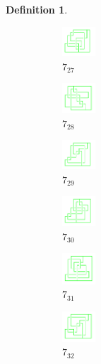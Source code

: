 \documentclass{article}
\theoremstyle{definition}
\newtheorem{defn}[thm]{Definition}
\theoremstyle{theorem}
\theoremstyle{proposition}
\theoremstyle{corollary}
\begin{document}
\begin{defn}
\begin{figure}[H]
    \begin{subfigure}{0.075\textwidth}
    \includegraphics[width=1.25cm]{../Midterm_Poster/grid_diagram/handcuff_7_27.png}
    \caption{$7_{27}$} 
    \end{subfigure}
    \begin{subfigure}{0.075\textwidth}
    \includegraphics[width=1.25cm]{../Midterm_Poster/grid_diagram/handcuff_7_28.png}
    \caption{$7_{28}$} 
    \end{subfigure}
    \begin{subfigure}{0.075\textwidth}
    \includegraphics[width=1.25cm]{../Midterm_Poster/grid_diagram/handcuff_7_29.png}
    \caption{$7_{29}$} 
    \end{subfigure}
    \begin{subfigure}{0.075\textwidth}
    \includegraphics[width=1.25cm]{../Midterm_Poster/grid_diagram/handcuff_7_30.png}
    \caption{$7_{30}$} 
    \end{subfigure}
    \begin{subfigure}{0.075\textwidth}
    \includegraphics[width=1.25cm]{../Midterm_Poster/grid_diagram/handcuff_7_31.png}
    \caption{$7_{31}$} 
    \end{subfigure}
    \begin{subfigure}{0.075\textwidth}
    \includegraphics[width=1.25cm]{../Midterm_Poster/grid_diagram/handcuff_7_32.png}
    \caption{$7_{32}$} 
    \end{subfigure}
    \begin{subfigure}{0.075\textwidth}

\end{subfigure}
\end{figure}
\end{defn}
\end{document}
